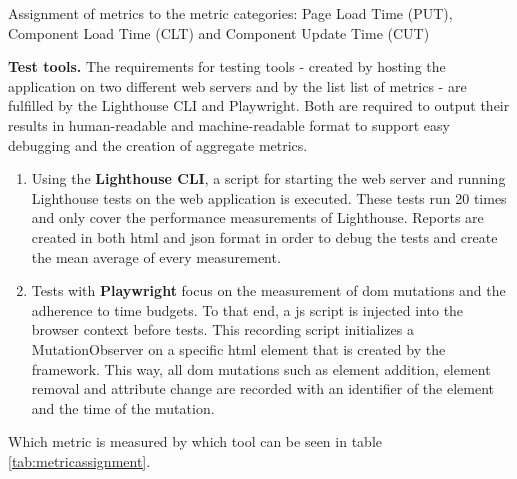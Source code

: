 \documentclass[a4paper, 12pt]{article}
\begin{document}
\begin{table}[h]
\begin{center}
  \end{center}
  \caption{Assignment of metrics to the metric categories: Page Load Time (PUT), Component Load Time (CLT) and Component Update Time (CUT)}
  \label{tab:metriccategories}
\end{table}

\textbf{Test tools.} The requirements for testing tools - created by hosting the application on two different web servers and by the list list of metrics - are fulfilled by the Lighthouse CLI and Playwright.
Both are required to output their results in human-readable and machine-readable format to support easy debugging and the creation of aggregate metrics.
\\

\begin{enumerate}
  \item Using the \textbf{Lighthouse CLI}, a script for starting the web server and running Lighthouse tests on the web application is executed.
  These tests run 20 times and only cover the performance measurements of Lighthouse.
  Reports are created in both \acrshort{html} and \acrshort{json} format in order to debug the tests and create the mean average of every measurement.
  \item Tests with \textbf{Playwright} focus on the measurement of \acrshort{dom} mutations and the adherence to time budgets.
  To that end, a \acrshort{js} script is injected into the browser context before tests.
  This recording script initializes a MutationObserver on a specific \acrshort{html} element that is created by the framework.
  This way, all \acrshort{dom} mutations such as element addition, element removal and attribute change are recorded with an identifier of the element and the time of the mutation.
\end{enumerate}

Which metric is measured by which tool can be seen in table \ref{tab:metricassignment}.
\end{document}
